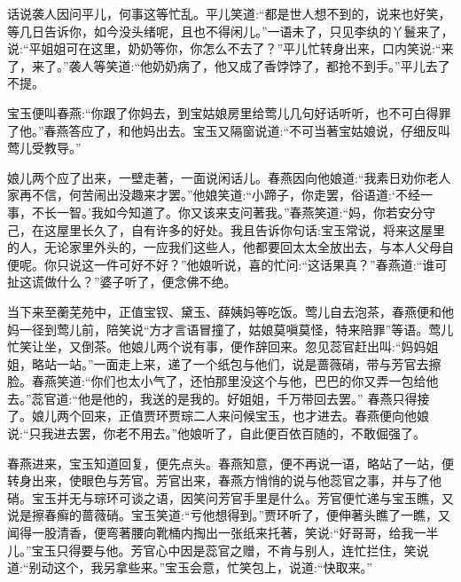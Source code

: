 
\begin{parag}
    话说袭人因问平儿，何事这等忙乱。平儿笑道:“都是世人想不到的，说来也好笑，等几日告诉你，如今没头绪呢，且也不得闲儿。”一语未了，只见李纨的丫鬟来了，说:“平姐姐可在这里，奶奶等你，你怎么不去了？”平儿忙转身出来，口内笑说:“来了，来了。”袭人等笑道:“他奶奶病了，他又成了香饽饽了，都抢不到手。”平儿去了不提。
\end{parag}


\begin{parag}
    宝玉便叫春燕:“你跟了你妈去，到宝姑娘房里给莺儿几句好话听听，也不可白得罪了他。”春燕答应了，和他妈出去。宝玉又隔窗说道:“不可当著宝姑娘说，仔细反叫莺儿受教导。”
\end{parag}


\begin{parag}
    娘儿两个应了出来，一壁走著，一面说闲话儿。春燕因向他娘道:“我素日劝你老人家再不信，何苦闹出没趣来才罢。”他娘笑道:“小蹄子，你走罢，俗语道:‘不经一事，不长一智。’我如今知道了。你又该来支问著我。”春燕笑道:“妈，你若安分守己，在这屋里长久了，自有许多的好处。我且告诉你句话:宝玉常说，将来这屋里的人，无论家里外头的，一应我们这些人，他都要回太太全放出去，与本人父母自便呢。你只说这一件可好不好？”他娘听说，喜的忙问:“这话果真？”春燕道:“谁可扯这谎做什么？”婆子听了，便念佛不绝。
\end{parag}


\begin{parag}
    当下来至蘅芜苑中，正值宝钗、黛玉、薛姨妈等吃饭。莺儿自去泡茶，春燕便和他妈一径到莺儿前，陪笑说“方才言语冒撞了，姑娘莫嗔莫怪，特来陪罪”等语。莺儿忙笑让坐，又倒茶。他娘儿两个说有事，便作辞回来。忽见蕊官赶出叫:“妈妈姐姐，略站一站。”一面走上来，递了一个纸包与他们，说是蔷薇硝，带与芳官去擦脸。春燕笑道:“你们也太小气了，还怕那里没这个与他，巴巴的你又弄一包给他去。”蕊官道:“他是他的，我送的是我的。好姐姐，千万带回去罢。” 春燕只得接了。娘儿两个回来，正值贾环贾琮二人来问候宝玉，也才进去。春燕便向他娘说:“只我进去罢，你老不用去。”他娘听了，自此便百依百随的，不敢倔强了。
\end{parag}


\begin{parag}
    春燕进来，宝玉知道回复，便先点头。春燕知意，便不再说一语，略站了一站，便转身出来，使眼色与芳官。芳官出来，春燕方悄悄的说与他蕊官之事，并与了他硝。宝玉并无与琮环可谈之语，因笑问芳官手里是什么。芳官便忙递与宝玉瞧，又说是擦春癣的蔷薇硝。宝玉笑道:“亏他想得到。”贾环听了，便伸著头瞧了一瞧，又闻得一股清香，便弯著腰向靴桶内掏出一张纸来托著，笑说:“好哥哥，给我一半儿。”宝玉只得要与他。芳官心中因是蕊官之赠，不肯与别人，连忙拦住，笑说道:“别动这个，我另拿些来。”宝玉会意，忙笑包上，说道:“快取来。”
\end{parag}


